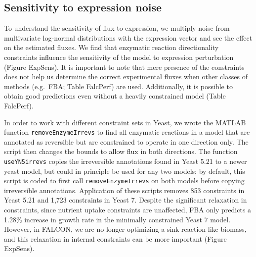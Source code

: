 \subsection{Sensitivity to expression noise}
To understand the sensitivity of flux to expression, we multiply noise
from multivariate log-normal distributions with the expression vector
and see the effect on the estimated fluxes. We find that enzymatic
reaction directionality constraints influence the sensitivity of the
model to expression perturbation (Figure ExpSens). It is important to
note that mere presence of the constraints does not help us determine
the correct experimental fluxes when other classes of methods (e.g.\
FBA; Table FalcPerf) are used. Additionally, it is possible to obtain
good predictions even without a heavily constrained model (Table
FalcPerf).

In order to work with different constraint sets in Yeast, we wrote the
MATLAB function \texttt{removeEnzymeIrrevs} to find all enzymatic
reactions in a model that are annotated as reversible but are
constrained to operate in one direction only. The script then changes
the bounds to allow flux in both directions. The function
\texttt{useYN5irrevs} copies the irreversible annotations found in
Yeast 5.21 \citep{Lee2012} to a newer yeast model, but could in
principle be used for any two models; by default, this script is coded
to first call \texttt{removeEnzymeIrrevs} on both models before
copying irreversible annotations. Application of these scripts removes
853 constraints in Yeast 5.21 and 1,723 constraints in Yeast
7. Despite the significant relaxation in constraints, since nutrient
uptake constraints are unaffected, FBA only predicts a 1.28\%
increase in growth rate in the minimally constrained Yeast 7
model. However, in FALCON, we are no longer optimizing a sink reaction
like biomass, and this relaxation in internal constraints can be more
important (Figure ExpSens).

